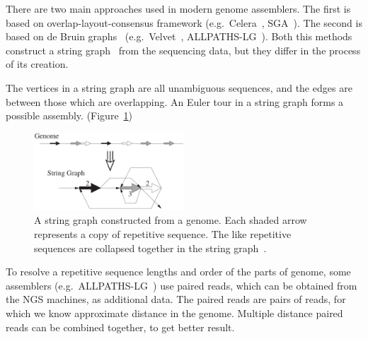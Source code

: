 There are two main approaches used in modern genome assemblers. The first is based on overlap-layout-consensus framework (e.g.\ Celera~\cite{myers2000celera}, SGA~\cite{simpson2010sga}). The second is based on de Bruin graphs~\cite{deBruijn} (e.g.\ Velvet~\cite{zerbino2008velvet}, ALLPATHS-LG~\cite{gnerre2011allpaths}). Both this methods construct a string graph~\cite{myers2005stringgraph} from the sequencing data, but they differ in the process of its creation.

The vertices in a string graph are all unambiguous sequences, and the edges are between those which are overlapping. An Euler tour in a string graph forms a possible assembly. (Figure~\ref{fig:string-graph})

\begin{figure}[htbp]
  \centering
  \includegraphics[width=0.5\textwidth]{../figures/string-graph.png}
  \caption[String graph]{A string graph constructed from a genome.
  Each shaded arrow represents a copy of repetitive sequence.
  The like repetitive sequences are collapsed together in the string graph~\cite{myers2005stringgraph}.}\label{fig:string-graph}
\end{figure}

To resolve a repetitive sequence lengths and order of the parts of genome, some assemblers  (e.g.\ ALLPATHS-LG~\cite{gnerre2011allpaths}) use paired reads, which can be obtained from the NGS machines, as additional data. The paired reads are pairs of reads, for which we know approximate distance in the genome. Multiple distance paired reads can be combined together, to get better result.
